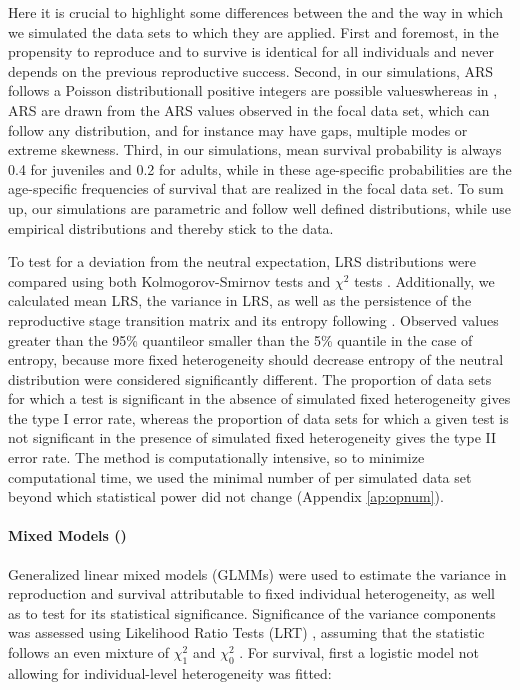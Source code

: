 Here it is crucial to highlight some differences between the \NSM and the way in which we simulated the data sets to which they are applied. First and foremost, in \NSM the propensity to reproduce and to survive is identical for all individuals and never depends on the previous reproductive success. Second, in our simulations, ARS follows a Poisson distribution\textemdash all positive integers are possible values\textemdash whereas in \NSM, ARS are drawn from the ARS values observed in the focal data set, which can follow any distribution, and for instance may have gaps, multiple modes or extreme skewness. Third, in our simulations, mean survival probability is always 0.4 for juveniles and 0.2 for adults, while in \NSM these age-specific probabilities are the age-specific frequencies of survival that are realized in the focal data set. To sum up, our simulations are parametric and follow well defined distributions, while \NSM use empirical distributions and thereby stick to the data.

To test for a deviation from the neutral expectation, LRS distributions were compared using both Kolmogorov-Smirnov tests \parencite[used in][]{Steiner2010} and $\chi^2$ tests \parencite[used in][]{Plard2012}. Additionally, we calculated mean LRS, the variance in LRS, as well as the persistence of the reproductive stage transition matrix and its entropy following \cite{Plard2012}. Observed values greater than the 95\% quantile\textemdash or smaller than the 5\% quantile in the case of entropy, because more fixed heterogeneity should decrease entropy \parencite{Tuljapurkar2009}\textemdash of the neutral distribution were considered significantly different. 
The proportion of data sets for which a test is significant in the absence of simulated fixed heterogeneity gives the type I error rate, whereas the proportion of data sets for which a given test is not significant in the presence of simulated fixed heterogeneity gives the type II error rate. The \NSM method is computationally intensive, so to minimize computational time, we used the minimal number of \NSM per simulated data set beyond which statistical power did not change (Appendix \ref{ap:opnum}).

\paragraph{Mixed Models (\MM)}
Generalized linear mixed models (GLMMs) were used to estimate the variance in reproduction and survival attributable to fixed individual heterogeneity, as well as to test for its statistical significance. Significance of the variance components was assessed using Likelihood Ratio Tests (LRT) \parencite[see e.g.][]{Pinheiro2000,Crainiceanu2004}, assuming that the statistic follows an even mixture of $\chi_{1}^2$ and $\chi_{0}^2$ \parencite{Self1987}.
For survival, first a logistic model not allowing for individual-level heterogeneity was fitted:

